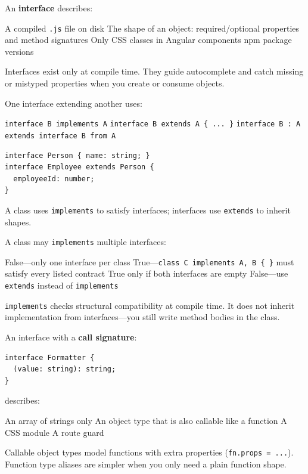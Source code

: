 \question[4]
An \textbf{interface} describes:
\begin{choices}
  \choice A compiled \texttt{.js} file on disk
  \CorrectChoice The shape of an object: required/optional properties and method signatures
  \choice Only CSS classes in Angular components
  \choice npm package versions
\end{choices}
\begin{solution}
  Interfaces exist only at compile time. They guide autocomplete and catch missing or mistyped properties when you create or consume objects.
\end{solution}

\question[4]
One interface extending another uses:
\begin{choices}
  \choice \lstinline[style=tsinline]|interface B implements A|
  \CorrectChoice \lstinline[style=tsinline]|interface B extends A { ... }|
  \choice \lstinline[style=tsinline]|interface B : A|
  \choice \lstinline[style=tsinline]|extends interface B from A|
\end{choices}
\begin{solution}
\begin{lstlisting}[style=ts]
interface Person { name: string; }
interface Employee extends Person {
  employeeId: number;
}
\end{lstlisting}
  A class uses \lstinline[style=tsinline]|implements| to satisfy interfaces; interfaces use \lstinline[style=tsinline]|extends| to inherit shapes.
\end{solution}

\question[4]
A class may \lstinline[style=tsinline]|implements| multiple interfaces:
\begin{choices}
  \choice False---only one interface per class
  \CorrectChoice True---\lstinline[style=tsinline]|class C implements A, B { }| must satisfy every listed contract
  \choice True only if both interfaces are empty
  \choice False---use \lstinline[style=tsinline]|extends| instead of \lstinline[style=tsinline]|implements|
\end{choices}
\begin{solution}
  \lstinline[style=tsinline]|implements| checks structural compatibility at compile time. It does not inherit implementation from interfaces---you still write method bodies in the class.
\end{solution}

\question[4]
An interface with a \textbf{call signature}:
\begin{lstlisting}[style=ts]
interface Formatter {
  (value: string): string;
}
\end{lstlisting}
describes:
\begin{choices}
  \choice An array of strings only
  \CorrectChoice An object type that is also callable like a function
  \choice A CSS module
  \choice A route guard
\end{choices}
\begin{solution}
  Callable object types model functions with extra properties (\lstinline[style=tsinline]|fn.props = ...|). Function type aliases are simpler when you only need a plain function shape.
\end{solution}

